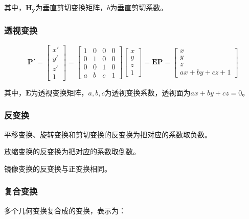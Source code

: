 \documentclass[cn, blue, normal, 12pt]{elegantnote}
\begin{document}
其中，$\bm{H_{y}}$为垂直剪切变换矩阵，$b$为垂直剪切系数。

\subsubsection{透视变换}

\begin{equation}
    \bm{P'}=\left[
        \begin{array}{c}
            x' \\ y' \\ z' \\ 1
        \end{array}
    \right]=\left[
        \begin{array}{cccc}
            1 & 0 & 0 & 0 \\
            0 & 1 & 0 & 0 \\
            0 & 0 & 1 & 0 \\
            a & b & c & 1
        \end{array}
    \right]\left[
        \begin{array}{c}
            x \\ y \\ z \\ 1
        \end{array}
    \right]=\bm{EP}=\left[
        \begin{array}{c}
            x \\ y \\ z \\ ax+by+cz+1
        \end{array}
    \right]
\end{equation}

其中，$\bm{E}$为透视变换矩阵，$a,b,c$为透视变换系数，透视面为$ax+by+cz=0$。

\subsubsection{反变换}

平移变换、旋转变换和剪切变换的反变换为把对应的系数取负数。

放缩变换的反变换为把对应的系数取倒数。

镜像变换的反变换与正变换相同。

\subsubsection{复合变换}

多个几何变换复合成的变换，表示为：
\end{document}
